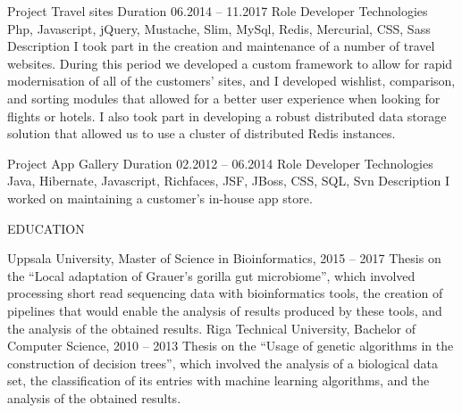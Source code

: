 \documentclass[12pt]{article}
\begin{document}
Project
Travel sites
Duration
06.2014 – 11.2017
Role
Developer
Technologies
Php, Javascript, jQuery, Mustache, Slim, MySql, Redis, Mercurial, CSS, Sass
Description
I took part in the creation and maintenance of a number of travel websites. During this period we developed a custom framework to allow for rapid modernisation of all of the customers' sites, and I developed wishlist, comparison, and sorting modules that allowed for a better user experience when looking for flights or hotels. I also took part in developing a robust distributed data storage solution that allowed us to use a cluster of distributed Redis instances.

Project
App Gallery
Duration
02.2012 – 06.2014
Role
Developer
Technologies
Java, Hibernate, Javascript, Richfaces, JSF, JBoss, CSS, SQL, Svn
Description
I worked on maintaining a customer's in-house app store.

EDUCATION

Uppsala University, Master of Science in Bioinformatics, 2015 – 2017
Thesis on the “Local adaptation of Grauer’s gorilla gut microbiome”, which involved processing short read sequencing data with bioinformatics tools, the creation of pipelines that would enable the analysis of results produced by these tools, and the analysis of the obtained results.
Riga Technical University, Bachelor of Computer Science, 2010 – 2013
Thesis on the “Usage of genetic algorithms in the construction of decision trees”, which involved the analysis of a biological data set, the classification of its entries with machine learning algorithms, and the analysis of the obtained results.
\end{document}
